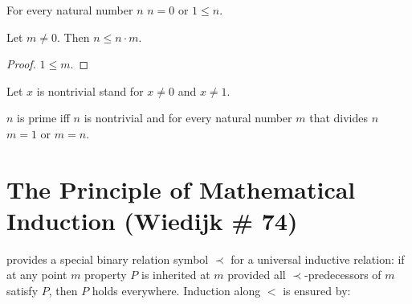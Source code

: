 \documentclass{article}
\begin{document}
\begin{forthel}
\begin{lemma}
For every natural number $n$ $n = 0$ or $1 \leq n$.
\end{lemma}


\begin{lemma}
Let $m \neq 0$. Then $n \leq n \cdot m$.
\end{lemma}
\begin{proof}
$1 \leq m$.
\end{proof}

Let $x$ is nontrivial stand for $x \neq 0$ and $x \neq 1$.

\begin{definition}
$n$ is prime iff $n$ is nontrivial and
for every natural number $m$ that divides $n$ $m = 1$ or $m = n$.
\end{definition}

\end{forthel}

\section{The Principle of Mathematical Induction (Wiedijk \# 74)}

\Naproche provides a special binary relation
symbol $\prec$ for a universal inductive relation: if at any
point $m$ property $P$ is inherited at $m$ provided all
$\prec$-predecessors of $m$ satisfy $P$, then $P$ holds everywhere.
Induction along $<$ is ensured by:
\end{document}
